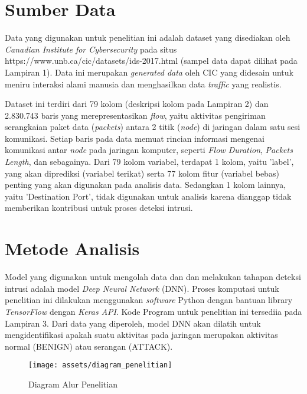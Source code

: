 \documentclass[a4paper,12pt]{report}
\begin{document}
\section{Sumber Data}
Data yang digunakan untuk penelitian ini adalah dataset yang disediakan oleh \textit{Canadian Institute for Cybersecurity} pada situs https://www.unb.ca/cic/datasets/ids-2017.html (sampel data dapat dilihat pada Lampiran 1). Data ini merupakan \textit{generated data} oleh CIC yang didesain untuk meniru interaksi alami manusia dan menghasilkan data \textit{traffic} yang realistis. 

Dataset ini terdiri dari 79 kolom (deskripsi kolom pada Lampiran 2) dan 2.830.743 baris yang merepresentasikan \textit{flow}, yaitu aktivitas pengiriman serangkaian paket data (\textit{packets}) antara 2 titik (\textit{node}) di jaringan dalam satu sesi komunikasi. Setiap baris pada data memuat rincian informasi mengenai komunikasi antar \textit{node} pada jaringan komputer, seperti \textit{Flow Duration}, \textit{Packets Length}, dan sebagainya. Dari 79 kolom variabel, terdapat 1 kolom, yaitu 'label', yang akan diprediksi (variabel terikat) serta 77 kolom fitur (variabel bebas) penting yang akan digunakan pada analisis data. Sedangkan 1 kolom lainnya, yaitu 'Destination Port', tidak digunakan untuk analisis karena dianggap tidak memberikan kontribusi untuk proses deteksi intrusi.

\section{Metode Analisis}
Model yang digunakan untuk mengolah data dan dan melakukan tahapan deteksi intrusi adalah model \textit{Deep Neural Network} (DNN). Proses komputasi untuk penelitian ini dilakukan menggunakan \textit{software} Python dengan bantuan library \textit{TensorFlow} dengan \textit{Keras API}. Kode Program untuk penelitian ini tersediia pada Lampiran 3. Dari data yang diperoleh, model DNN akan dilatih untuk mengidentifikasi apakah suatu aktivitas pada jaringan merupakan aktivitas normal (BENIGN) atau serangan (ATTACK). 

\begin{figure}[H]
	\center \texttt{[image: assets/diagram\_penelitian]}
	\caption{Diagram Alur Penelitian} 
	\label{diagram_penelitian}
\end{figure}
\end{document}
